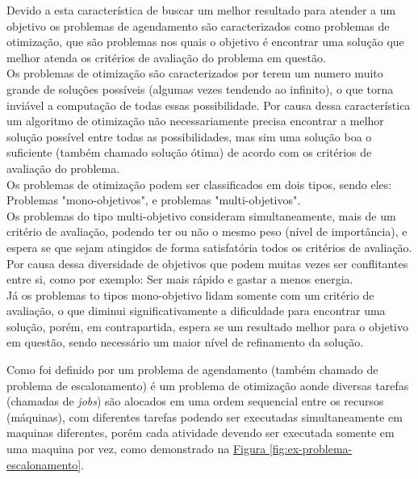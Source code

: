         Devido a esta característica de buscar um melhor resultado para atender a um objetivo os problemas de agendamento são caracterizados como problemas de otimização, que são problemas nos quais o objetivo é encontrar uma solução que melhor atenda os critérios de avaliação do problema em questão.\\
        \indent Os problemas de otimização são caracterizados por terem um numero muito grande de soluções possíveis (algumas vezes tendendo ao infinito), o que torna inviável a computação de todas essas possibilidade. Por causa dessa característica um algoritmo de otimização não necessariamente precisa encontrar a melhor solução possível entre todas as possibilidades, mas sim uma solução boa o suficiente (também chamado solução ótima) de acordo com os critérios de avaliação do problema.\\
        Os problemas de otimização podem ser classificados em dois tipos, sendo eles: Problemas "mono-objetivos", e problemas "multi-objetivos".\\
        Os problemas do tipo multi-objetivo consideram simultaneamente, mais de um critério de avaliação, podendo ter ou não o mesmo peso (nível de importância), e espera se que sejam atingidos de forma satisfatória todos os critérios de avaliação. Por causa dessa diversidade de objetivos que podem muitas vezes ser conflitantes entre si, como por exemplo: Ser mais rápido e gastar a menos energia.\\
        Já os problemas to tipos mono-objetivo lidam somente com um critério de avaliação, o que diminui significativamente a dificuldade para encontrar uma solução, porém, em contrapartida, espera se um resultado melhor para o objetivo em questão, sendo necessário um maior nível de refinamento da solução.

        Como foi definido por \cite{Bagchi1999} um problema de agendamento (também chamado de problema de escalonamento) é um problema de otimização aonde 
        diversas tarefas (chamadas de \textit{jobs}) são alocados em uma ordem sequencial entre os recursos (máquinas), 
        com diferentes tarefas podendo ser executadas simultaneamente
        em maquinas diferentes, porém cada atividade devendo ser executada somente em uma maquina por vez, como demonstrado na
        \hyperref[fig:ex-problema-escalonamento]{Figura \ref{fig:ex-problema-escalonamento}}.\\
        
